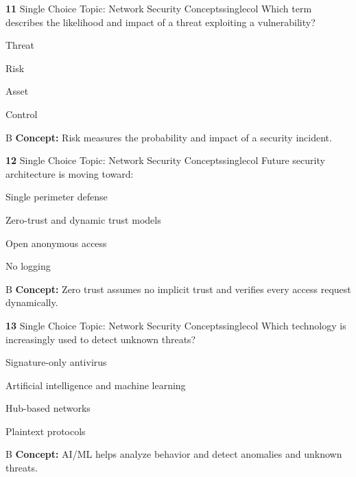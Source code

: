\documentclass[10pt,a4paper]{article}
\begin{document}
\begin{qcard}{\color{white}\textbf{11} \hfill \small Single Choice \textbar{} Topic: Network Security Concepts}{singlecol}
Which term describes the likelihood and impact of a threat exploiting a vulnerability?

\begin{qoptions}
\item Threat
\item Risk
\item Asset
\item Control
\end{qoptions}
\begin{explainbox}{B}
\textbf{Concept:} Risk measures the probability and impact of a security incident.
\end{explainbox}
\end{qcard}

\begin{qcard}{\color{white}\textbf{12} \hfill \small Single Choice \textbar{} Topic: Network Security Concepts}{singlecol}
Future security architecture is moving toward:

\begin{qoptions}
\item Single perimeter defense
\item Zero-trust and dynamic trust models
\item Open anonymous access
\item No logging
\end{qoptions}
\begin{explainbox}{B}
\textbf{Concept:} Zero trust assumes no implicit trust and verifies every access request dynamically.
\end{explainbox}
\end{qcard}

\begin{qcard}{\color{white}\textbf{13} \hfill \small Single Choice \textbar{} Topic: Network Security Concepts}{singlecol}
Which technology is increasingly used to detect unknown threats?

\begin{qoptions}
\item Signature-only antivirus
\item Artificial intelligence and machine learning
\item Hub-based networks
\item Plaintext protocols
\end{qoptions}
\begin{explainbox}{B}
\textbf{Concept:} AI/ML helps analyze behavior and detect anomalies and unknown threats.
\end{explainbox}
\end{qcard}
\end{document}
